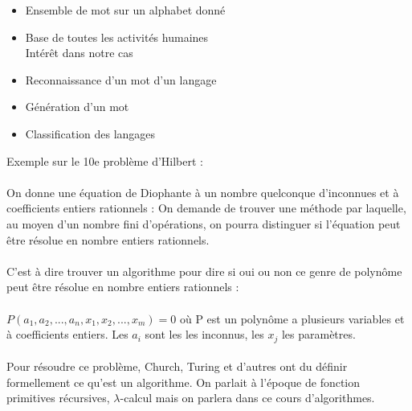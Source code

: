 \begin{itemize}
	\item Ensemble de mot sur un alphabet donné
	\item Base de toutes les activités humaines
	\\ Intérêt dans notre cas
	\item Reconnaissance d'un mot d'un langage
	\item Génération d'un mot
	\item Classification des langages
\end{itemize}

\center
{}

\flushleft
Exemple sur le 10e problème d'Hilbert :
\paragraph{}
On donne une équation de Diophante à un nombre quelconque d'inconnues et à coefficients entiers rationnels : On demande de trouver une méthode par laquelle, au moyen d'un nombre fini d'opérations, on pourra distinguer si l'équation peut être résolue en nombre entiers rationnels.
\paragraph{}
C'est à dire trouver un algorithme pour dire si oui ou non ce genre de polynôme peut être résolue en nombre entiers rationnels :\\
\paragraph{}
\begin{math}
P(a_1,a_2,...,a_n,x_1,x_2,...,x_m) = 0
\end{math}
où P est un polynôme a plusieurs variables et à coefficients entiers.
Les $a_i$ sont les les inconnus, les $x_j$ les paramètres.

\paragraph{}
Pour résoudre ce problème, Church, Turing et d'autres ont du définir formellement ce qu'est un algorithme.
On parlait à l'époque de fonction primitives récursives, $\lambda$-calcul mais on parlera dans ce cours d'algorithmes.

